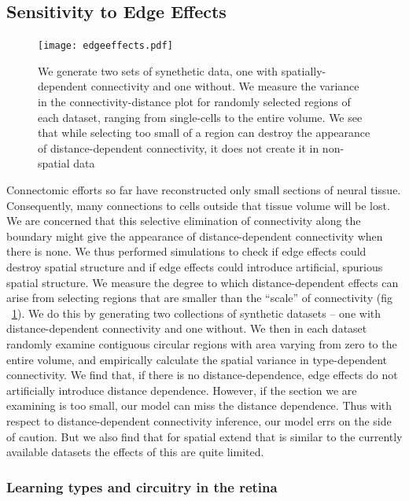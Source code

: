 \documentclass{article}
\begin{document}
\subsection*{Sensitivity to Edge Effects} 

\begin{figure}
  \centering 
  \centerline{\texttt{[image: edgeeffects.pdf]}}
  \caption{We generate two sets of synethetic data, one with
    spatially-dependent connectivity and one without. We measure the
    variance in the connectivity-distance plot for randomly selected
    regions of each dataset, ranging from single-cells to the entire
    volume. We see that while selecting too small of a region can 
    destroy the appearance of distance-dependent connectivity, 
    it does not create it in non-spatial data}
\label{fig:edgeeffects}
\end{figure}

Connectomic efforts so far have reconstructed only small sections of
neural tissue. Consequently, many connections to cells outside that tissue
volume will be lost. We are concerned that this selective elimination
of connectivity along the boundary might give the appearance of
distance-dependent connectivity when there is none. We thus performed
simulations to check if edge effects could destroy spatial structure
and if edge effects could introduce artificial, spurious spatial
structure. We measure the degree to which distance-dependent effects
can arise from selecting regions that are smaller than the ``scale''
of connectivity (fig ~\ref{fig:edgeeffects}). We do this by generating
two collections of synthetic datasets -- one with distance-dependent
connectivity and one without.  We then in each dataset randomly
examine contiguous circular regions with area varying from zero to the
entire volume, and empirically calculate the spatial variance in
type-dependent connectivity.  We find that, if there is no
distance-dependence, edge effects do not artificially introduce
distance dependence. However, if the section we are examining is too
small, our model can miss the distance dependence. Thus with respect
to distance-dependent connectivity inference, our model errs on the
side of caution. But we also find that for spatial extend that is
similar to the currently available datasets the effects of this are
quite limited.

\subsubsection*{Learning types and circuitry in the retina}
\end{document}
